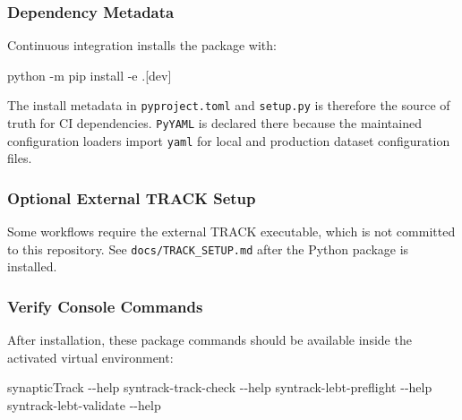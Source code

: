 \documentclass[
]{article}
\newenvironment{Shaded}{}{}
\newcommand{\AttributeTok}[1]{\textcolor[rgb]{0.49,0.56,0.16}{#1}}
\newcommand{\ExtensionTok}[1]{#1}
\newcommand{\NormalTok}[1]{#1}
\newcommand{\PreprocessorTok}[1]{\textcolor[rgb]{0.74,0.48,0.00}{#1}}
\newcommand{\SpecialStringTok}[1]{\textcolor[rgb]{0.73,0.40,0.53}{#1}}
\begin{document}
\hypertarget{dependency-metadata}{%
\subsubsection{Dependency Metadata}\label{dependency-metadata}}

Continuous integration installs the package with:

\begin{Shaded}
\begin{Highlighting}[]
\ExtensionTok{python} \AttributeTok{{-}m}\NormalTok{ pip install }\AttributeTok{{-}e}\NormalTok{ .}\PreprocessorTok{[}\SpecialStringTok{dev}\PreprocessorTok{]}
\end{Highlighting}
\end{Shaded}

The install metadata in \texttt{pyproject.toml} and \texttt{setup.py} is
therefore the source of truth for CI dependencies. \texttt{PyYAML} is
declared there because the maintained configuration loaders import
\texttt{yaml} for local and production dataset configuration files.

\hypertarget{optional-external-track-setup}{%
\subsubsection{Optional External TRACK
Setup}\label{optional-external-track-setup}}

Some workflows require the external TRACK executable, which is not
committed to this repository. See \texttt{docs/TRACK\_SETUP.md} after
the Python package is installed.

\hypertarget{verify-console-commands}{%
\subsubsection{Verify Console Commands}\label{verify-console-commands}}

After installation, these package commands should be available inside
the activated virtual environment:

\begin{Shaded}
\begin{Highlighting}[]
\ExtensionTok{synapticTrack} \AttributeTok{{-}{-}help}
\ExtensionTok{syntrack{-}track{-}check} \AttributeTok{{-}{-}help}
\ExtensionTok{syntrack{-}lebt{-}preflight} \AttributeTok{{-}{-}help}
\ExtensionTok{syntrack{-}lebt{-}validate} \AttributeTok{{-}{-}help}
\end{Highlighting}
\end{Shaded}
\end{document}
